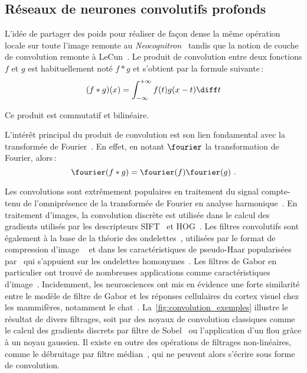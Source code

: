 \subsection{Réseaux de neurones convolutifs profonds}

L'idée de partager des poids pour réaliser de façon dense la même opération locale sur toute l'image remonte au \emph{Neocognitron}~\cite{fukushima_neocognitron_1980} tandis que la notion de couche de convolution remonte à LeCun~\cite{lecun_gradient-based_1998}. Le produit de convolution entre deux fonctions $f$ et $g$ est habituellement noté $f * g$ et s'obtient par la formule suivante\,:
$$(f * g)(x) = \int_{-\infty}^{+\infty} f(t)g(x-t) \diff t$$

Ce produit est commutatif et bilinéaire.

L'intérêt principal du produit de convolution est son lien fondamental avec la transformée de Fourier~\cite{fourier_propagation_1822}. En effet, en notant $\fourier$ la transformation de Fourier, alors\,:
$$\fourier(f \ast g) = \fourier (f)\fourier (g)~.$$

Les convolutions sont extrêmement populaires en traitement du signal compte-tenu de l'omniprésence de la transformée de Fourier en analyse harmonique~\cite{fourier_propagation_1822}. En traitement d'images, la convolution discrète est utilisée dans le calcul des gradients utilisés par les descripteurs \gls{SIFT}~\cite{lowe_object_1999} et \gls{HOG}~\cite{dalal_histograms_2005}. Les filtres convolutifs sont également à la base de la théorie des ondelettes~\cite{mallat_exploration_2001}, utilisées par le format de compression d'image ~\cite{daubechies_ten_1992} et dans les caractéristiques de pseudo-Haar popularisées par~\citet{viola_robust_2001} qui s'appuient sur les ondelettes homonymes~\cite{papageorgiou_general_1998}.
Les filtres de Gabor en particulier ont trouvé de nombreuses applications comme caractéristiques d'image~\cite{pati_word_2008}. Incidemment, les neurosciences ont mis en évidence une forte similarité entre le modèle de filtre de Gabor et les réponses cellulaires du cortex visuel chez les mammifères, notamment le chat~\cite{marcelja_mathematical_1980,jones_evaluation_1987}. La~\cref{fig:convolution_exemples} illustre le résultat de divers filtrages, soit par des noyaux de convolution classiques comme le calcul des gradients discrets par filtre de Sobel~\cite{sobel_isotropic_2014} ou l'application d'un flou grâce à un noyau gaussien. Il existe en outre des opérations de  filtrages non-linéaires, comme le débruitage par filtre médian~\cite{frieden_new_1976}, qui ne peuvent alors s'écrire sous forme de convolution.

